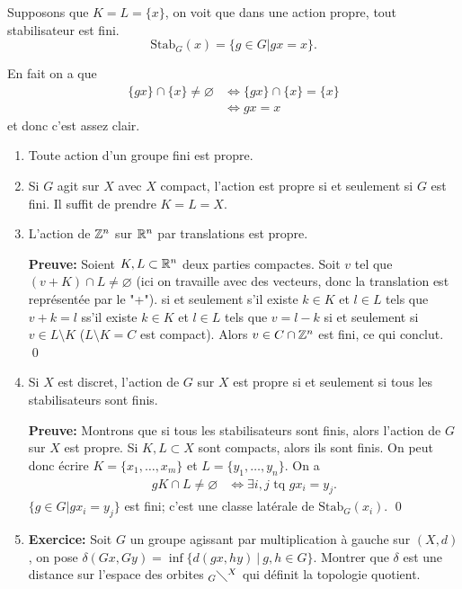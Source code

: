   \begin{prop}
    Supposons que $K = L = \{x\}$, on voit que dans une action propre, tout stabilisateur est fini.
      \[\mathrm{Stab}_G(x) = \{g \in G | gx = x\}.\]
  \end{prop}

  \begin{preuve}
    En fait on a que
    {
      \begin{align*}
        \{gx\} \cap \{x\} \neq \varnothing &\iff \{gx\} \cap \{x\} = \{x\}\\
        & \iff gx = x
      \end{align*}}
    et donc c'est assez clair.
  \end{preuve}


  \begin{exs}
    \begin{enumerate}
    \item Toute action d'un groupe fini est propre.
    \item Si $G$ agit sur $X$ avec $X$ compact, l'action est propre si et seulement si $G$ est fini. Il suffit
      de prendre $K = L = X$.
    \item L'action de $\mathbb{Z}^n$ sur $\mathbb{R}^n$ par translations est propre. 

      \textbf{Preuve:} Soient $K, L \subset \mathbb{R}^n$ deux parties compactes. Soit $v$ tel que $(v + K) \cap L
      \neq \varnothing$ (ici on travaille avec des vecteurs, donc la translation est représentée par le
      "+"). si et seulement s'il existe $k \in K$ et $l\in L$ tels que $v + k = l$ ss'il existe $k \in K$ et
      $l \in L$ tels que $v = l-k$ si et seulement si $v \in L \setminus K$ ($L \setminus K = C$ est
      compact). Alors $v \in C \cap \mathbb{Z}^n$ est fini, ce qui conclut. \qed

    \item Si $X$ est discret, l'action de $G$ sur $X$ est propre si et seulement si tous les stabilisateurs
      sont finis.

      \textbf{Preuve:} Montrons que si tous les stabilisateurs sont finis, alors l'action de $G$ sur $X$ est
      propre. Si $K, L \subset X$ sont compacts, alors ils sont finis. On peut donc écrire $K = \{x_1, \ldots,
      x_m\}$ et $L = \{y_1, \ldots, y_n\}$. On a 
      {
        \begin{align*}
          gK \cap L \neq \varnothing & \iff \exists i,j \text{ tq } gx_i = y_j.
        \end{align*}
      }
      $\{g \in G | gx_i = y_j\}$ est fini; c'est une classe latérale de $\mathrm{Stab}_G(x_i)$. \qed

    \item \textbf{Exercice:} Soit $G$ un groupe agissant par multiplication à gauche sur $(X, d)$, on pose
      $\delta(Gx, Gy) = \inf\{d(gx, hy)\ |\ g, h \in G\}$. Montrer que $\delta$ est une distance sur l'espace
      des orbites $_G \diagdown ^X$ qui définit la topologie quotient.
    \end{enumerate}
  \end{exs}




